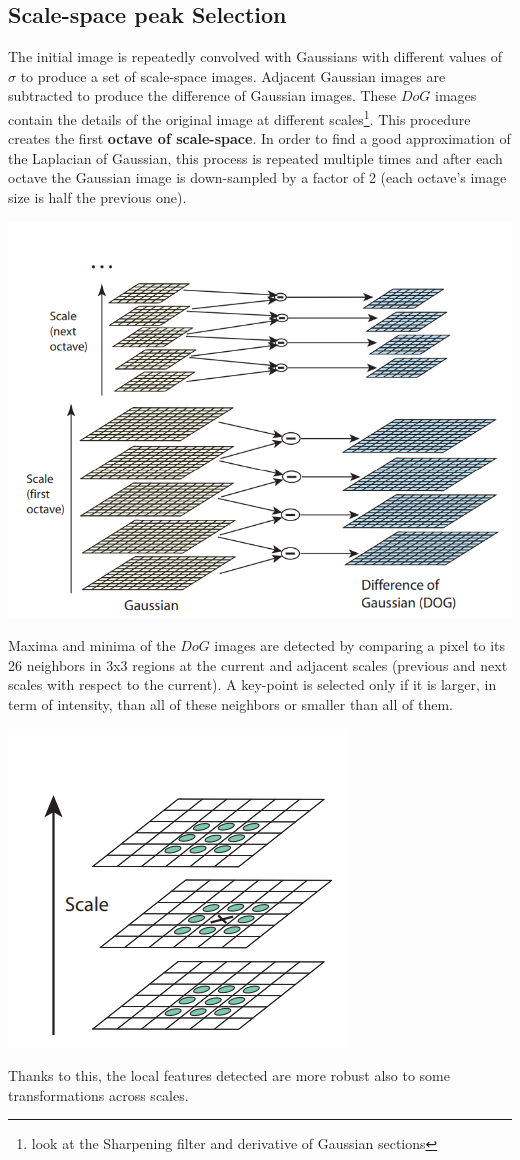 \subsection{Scale-space peak Selection}
The initial image is repeatedly convolved with Gaussians with different values of $\sigma$ to produce a set of scale-space images. Adjacent Gaussian images are subtracted to produce the difference of Gaussian images. These $DoG$ images contain the details of the original image at different scales\footnote{look at the Sharpening filter and derivative of Gaussian sections}. This procedure creates the first \textbf{ octave of scale-space}. In order to find a good approximation of the Laplacian of Gaussian, this process is repeated multiple times and after each octave the Gaussian image is down-sampled by a factor of 2 (each octave’s image size is half the previous one).
\begin{center}
    \includegraphics[scale = 0.9]{images/SIFT octaves.png}
\end{center}
Maxima and minima of the $DoG$ images are detected by comparing a pixel to its 26 neighbors in 3x3 regions at the current and adjacent scales (previous and next scales with respect to the current). A key-point is selected only if it is larger, in term of intensity, than all of these neighbors or smaller than all of them.
\begin{center}
    \includegraphics[]{images/SIFT DoG space.png}
\end{center}
Thanks to this, the local features detected are more robust also to some transformations across scales.

